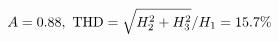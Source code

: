 \documentclass[preview]{standalone}
\begin{document}
\begin{align*}
\special{dvisvgm:raw <g id='unique000'>}A=0.88,\ \text{THD}=\sqrt{H_2^2+H_3^2}/H_1=15.7\%\special{dvisvgm:raw </g>}
\end{align*}
\end{document}
